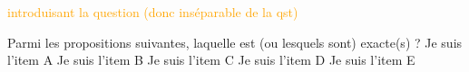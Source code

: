 \documentclass[12pt]{article}
\begin{document}
\textcolor{red}{\lipsum[1]}

\inseparable %


\textcolor{orange}{\lipsum[2] introduisant la question (donc inséparable de la qst)}

{Parmi les propositions suivantes, laquelle est (ou lesquels sont) exacte(s) ?}
{Je suis l'item A}
{Je suis l'item B}
{Je suis l'item C}
{Je suis l'item D}
{Je suis l'item E}


\end{document}
